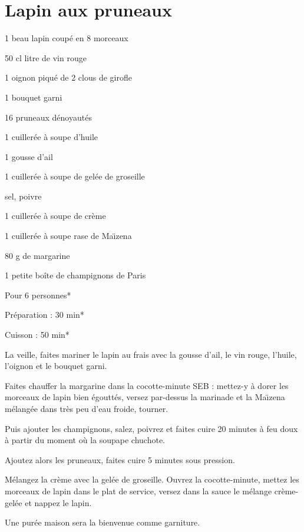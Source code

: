 \section[\normalsize{Lapin aux pruneaux}]{Lapin aux pruneaux}

\begin{ingredients}
\item	1 beau lapin coup\'e en 8 morceaux
\item	50 cl litre de vin rouge
\item	1 oignon piqu\'e de 2 clous de girofle
\item	1 bouquet garni
\item	16 pruneaux d\'enoyaut\'es 
\item	1 cuiller\'ee \`a soupe d’huile
\item	1 gousse d’ail
\item	1 cuiller\'ee \`a soupe de gel\'ee de groseille
\item	sel, poivre
\item	1 cuiller\'ee \`a soupe de cr\`eme
\item	1 cuiller\'ee \`a soupe rase de Ma\"\i zena
\item	80 g de margarine
\item	1 petite boîte de champignons de Paris
\end{ingredients}
\begin{infos}
\item Pour 6 personnes*
\item Préparation : 30 min*
\item Cuisson : 50 min*
\end{infos}
\begin{etapes}
\item La veille, faites mariner le lapin au frais avec la gousse d’ail, le vin rouge, l’huile, l’oignon et le bouquet garni.
\item Faites chauffer la margarine dans la cocotte-minute SEB : mettez-y \`a dorer les morceaux de lapin bien \'egoutt\'es, versez par-dessus la marinade et la Ma\"\i zena m\'elang\'ee dans tr\`es peu d’eau froide, tourner. 
\item Puis ajouter les champignons, salez, poivrez et faites cuire 20 minutes \`a feu doux \`a partir du moment où la soupape chuchote.
\item Ajoutez alors les pruneaux, faites cuire 5 minutes sous pression.
\item M\'elangez la cr\`eme avec la gel\'ee de groseille. Ouvrez la cocotte-minute, mettez les morceaux de lapin dans le plat de service, versez dans la sauce le m\'elange cr\`eme-gel\'ee et nappez le lapin.
\end{etapes}
\begin{conseils}
Une pur\'ee maison sera la bienvenue comme garniture.
\end{conseils}